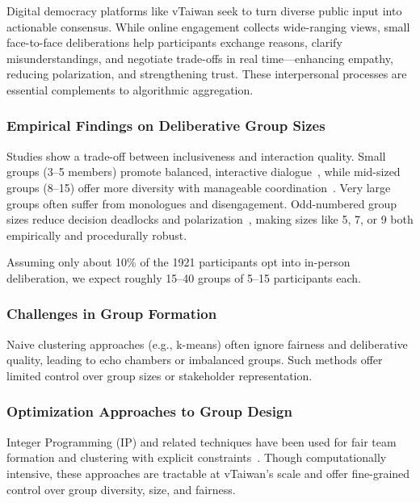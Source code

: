 Digital democracy platforms like vTaiwan seek to turn diverse public input into actionable consensus.
While online engagement collects wide-ranging views, small face-to-face deliberations help participants
exchange reasons, clarify misunderstandings, and negotiate trade-offs in real time—enhancing empathy,
reducing polarization, and strengthening trust.
These interpersonal processes are essential complements to algorithmic aggregation.

\subsubsection*{Empirical Findings on Deliberative Group Sizes}\label{subsec:group_sizes}

Studies show a trade-off between inclusiveness and interaction quality.
Small groups (3–5 members) promote balanced, interactive dialogue~\parencite{fay2000group},
while mid-sized groups (8–15) offer more diversity with manageable
coordination~\parencite{involve_citizensjury, fishkin2009deliberative}.
Very large groups often suffer from monologues and disengagement.
Odd-numbered group sizes reduce decision deadlocks and polarization~\parencite{menon2011oddgroups},
making sizes like 5, 7, or 9 both empirically and procedurally robust.

Assuming only about 10\% of the 1921 participants opt into in-person deliberation,
we expect roughly 15–40 groups of 5–15 participants each.

\subsubsection*{Challenges in Group Formation}

Naive clustering approaches (e.g., k-means) often ignore fairness and deliberative quality,
leading to echo chambers or imbalanced groups.
Such methods offer limited control over group sizes or stakeholder representation.

\subsubsection*{Optimization Approaches to Group Design}

Integer Programming (IP) and related techniques have been used for fair team formation and clustering
with explicit constraints~\parencite{anagnostopoulos2012groupformation, celis2018fair}.
Though computationally intensive, these approaches are tractable at vTaiwan’s scale and offer
fine-grained control over group diversity, size, and fairness.
